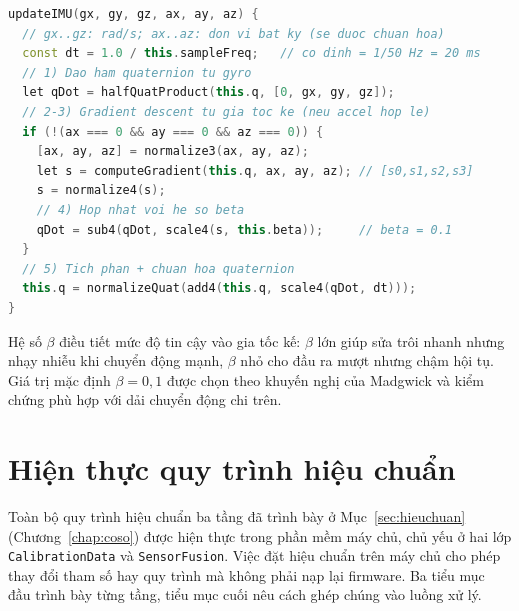 \documentclass[../DoAn.tex]{subfiles}
\begin{document}
\begin{lstlisting}[language=C++, caption={Cấu trúc hàm cập nhật Madgwick 6DOF (rút gọn).}, label={lst:madgwick}]
updateIMU(gx, gy, gz, ax, ay, az) {
  // gx..gz: rad/s; ax..az: don vi bat ky (se duoc chuan hoa)
  const dt = 1.0 / this.sampleFreq;   // co dinh = 1/50 Hz = 20 ms
  // 1) Dao ham quaternion tu gyro
  let qDot = halfQuatProduct(this.q, [0, gx, gy, gz]);
  // 2-3) Gradient descent tu gia toc ke (neu accel hop le)
  if (!(ax === 0 && ay === 0 && az === 0)) {
    [ax, ay, az] = normalize3(ax, ay, az);
    let s = computeGradient(this.q, ax, ay, az); // [s0,s1,s2,s3]
    s = normalize4(s);
    // 4) Hop nhat voi he so beta
    qDot = sub4(qDot, scale4(s, this.beta));     // beta = 0.1
  }
  // 5) Tich phan + chuan hoa quaternion
  this.q = normalizeQuat(add4(this.q, scale4(qDot, dt)));
}
\end{lstlisting}

Hệ số $\beta$ điều tiết mức độ tin cậy vào gia tốc kế: $\beta$ lớn giúp sửa trôi nhanh nhưng nhạy nhiễu khi chuyển động mạnh, $\beta$ nhỏ cho đầu ra mượt nhưng chậm hội tụ. Giá trị mặc định $\beta = 0{,}1$ được chọn theo khuyến nghị của Madgwick và kiểm chứng phù hợp với dải chuyển động chi trên.




\section{Hiện thực quy trình hiệu chuẩn}
\label{sec:impl_calib}

Toàn bộ quy trình hiệu chuẩn ba tầng đã trình bày ở Mục~\ref{sec:hieuchuan} (Chương~\ref{chap:coso}) được hiện thực trong phần mềm máy chủ, chủ yếu ở hai lớp \texttt{CalibrationData} và \texttt{SensorFusion}. Việc đặt hiệu chuẩn trên máy chủ cho phép thay đổi tham số hay quy trình mà không phải nạp lại firmware. Ba tiểu mục đầu trình bày từng tầng, tiểu mục cuối nêu cách ghép chúng vào luồng xử lý.
\end{document}
